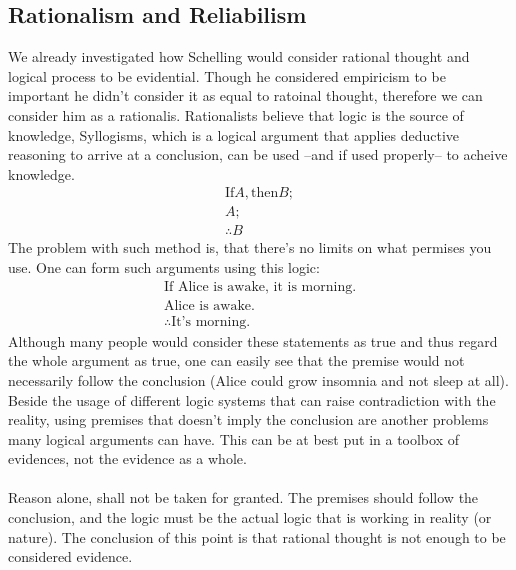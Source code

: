 \documentclass[10pt,a4paper]{article}
\begin{document}
                \subsection{Rationalism and Reliabilism} We already investigated how Schelling would consider rational thought and logical process to be evidential. Though he considered empiricism to be important he didn't consider it as equal to ratoinal thought, therefore we can consider him as a rationalis. Rationalists believe that logic is the source of knowledge, Syllogisms, which is a logical argument that applies deductive reasoning to arrive at a conclusion, can be used --and if used properly-- to acheive knowledge. \cite{enwiki:1145200450}
                \begin{align*}
                    \text{If} A, \text{then} B;
                    \\ A;
                    \\ \therefore B
                \end{align*}
                The problem with such method is, that there's no limits on what permises you use. One can form such arguments using this logic:
                \begin{align*}
                    \text{If Alice is awake, it is morning.}
                    \\ \text {Alice is awake.}
                    \\ \therefore \text{It's morning.}
                \end{align*}
                Although many people would consider these statements as true and thus regard the whole argument as true, one can easily see that the premise would not necessarily follow the conclusion (Alice could grow insomnia and not sleep at all). Beside the usage of different logic systems that can raise contradiction with the reality, using premises that doesn't imply the conclusion are another problems many logical arguments can have. This can be at best put in a toolbox of evidences, not the evidence as a whole.
                \\
                \\
                Reason alone, shall not be taken for granted. The premises should follow the conclusion, and the logic must be the actual logic that is working in reality (or nature). The conclusion of this point is that rational thought is not enough to be considered evidence. \cite{CW/E}
                \\
                \\
\end{document}
